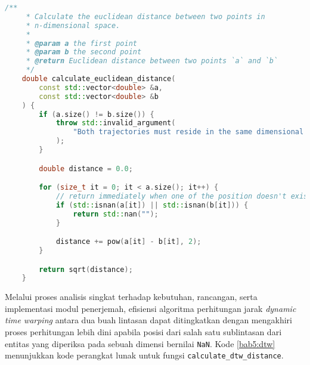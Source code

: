 \begin{lstlisting}[language=C++, caption=Implementasi fungsi \texttt{calculate\_euclidean\_distance}, label={bab5:euclidean}]
    /**
     * Calculate the euclidean distance between two points in
     * n-dimensional space.
     * 
     * @param a the first point
     * @param b the second point
     * @return Euclidean distance between two points `a` and `b`
     */
    double calculate_euclidean_distance(
        const std::vector<double> &a,
        const std::vector<double> &b
    ) {
        if (a.size() != b.size()) {
            throw std::invalid_argument(
                "Both trajectories must reside in the same dimensional space."
            );
        }

        double distance = 0.0;

        for (size_t it = 0; it < a.size(); it++) {
            // return immediately when one of the position doesn't exist
            if (std::isnan(a[it]) || std::isnan(b[it])) {
                return std::nan("");
            }

            distance += pow(a[it] - b[it], 2);
        }

        return sqrt(distance);
    }
\end{lstlisting}

Melalui proses analisis singkat terhadap kebutuhan, rancangan, serta implementasi modul penerjemah, efisiensi algoritma perhitungan jarak \textit{dynamic time warping} antara dua buah lintasan dapat ditingkatkan dengan mengakhiri proses perhitungan lebih dini apabila posisi dari salah satu sublintasan dari entitas yang diperiksa pada sebuah dimensi bernilai \texttt{NaN}. Kode \ref{bab5:dtw} menunjukkan kode perangkat lunak untuk fungsi \texttt{calculate\_dtw\_distance}.

\clearpage

